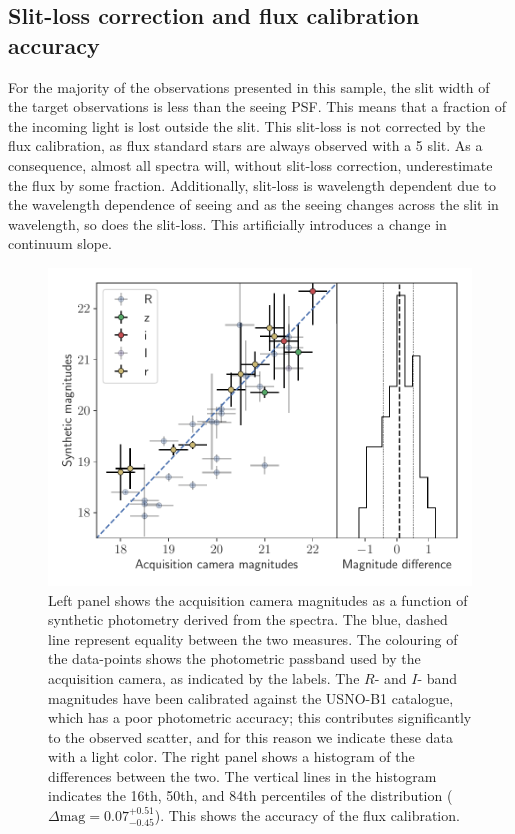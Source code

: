 \documentclass[longauth]{aa}    %
\begin{document}
\subsection{Slit-loss correction and flux calibration accuracy} \label{fluxes}

For the majority of the observations presented in this sample, the slit width of
the target observations is less than the seeing PSF. This means that a fraction
of the incoming light is lost outside the slit. This slit-loss is not corrected
by the flux calibration, as flux standard stars are always observed with a
5\arcsec{} slit. As a consequence, almost all spectra will, without slit-loss
correction, underestimate the flux by some fraction. Additionally, slit-loss
is wavelength dependent due to the wavelength dependence of seeing
\citep{Boyd1978} and as the seeing changes across the slit in wavelength, so
does the slit-loss. This artificially introduces a change in continuum slope.

\begin{figure}[!t]
	\centerline{\includegraphics[width=\columnwidth]{figures/flux_accuracy}}
\caption{Left panel shows the acquisition camera magnitudes as a function
	of synthetic photometry derived from the spectra. The blue, dashed line
	represent equality between the two measures. The colouring of the data-points
	shows the photometric passband used by the acquisition camera, as indicated by
	the labels. The $R$- and $I$- band magnitudes have been calibrated against the
	USNO-B1 catalogue, which has a poor photometric accuracy; this contributes
	significantly to the observed scatter, and for this reason we indicate these
	data with a light color.  The right panel shows a histogram of the differences
	between the two. The vertical lines in the histogram indicates the 16th, 50th,
	and 84th percentiles of the distribution ($\Delta \mathrm{mag} = 0.07 ^{+0.51}
	_{-0.45} $). This shows the accuracy of the flux calibration.}
\label{fig:flux_acq}
\end{figure}
\end{document}
